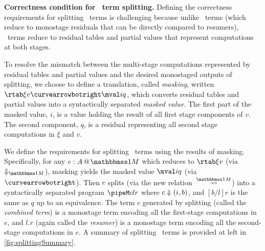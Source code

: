 \begin{abstrsyn}

\textbf{Correctness condition for \bbonem\ term splitting.} Defining
the correctness requirements for splitting \bbonem\ terms is
challenging because unlike \bbtwo\ terms (which reduce to monostage
residuals that can be directly compared to resumers), \bbonem\ terms
reduce to residual tables and partial values that represent
computations at both stages.

To resolve the mismatch between the multi-stage computations
represented by residual tables and partial values and the desired
monostaged outputs of splitting, we choose to define a translation,
called {\em masking}, written $\rtab \xi v \vsplito \mval i q$, which
converts residual tables and partial values into a syntactically
separated {\em masked value}.  The first part of the masked value,
$i$, is a value holding the result of all first stage components of
$v$.  The second component, $q$, is a residual representing all second
stage computations in $\xi$ and $v$.

We define the requirements for splitting \bbonem\ terms using the
results of masking. Specifically, for any $\colmix e A$ which reduces
to $\rtab \xi v$ (via $\redonesym$), masking yields the masked value
$\mval i q$ (via~$\vsplito$).  Then $e$ splits (via the new
relation~$\splitonesym$) into a syntactically separated program
$\pipeM c l r$ where ${c} \Downarrow {(}i,b)$, and $[b/l]r$ is the same as
$q$ up to an equivalence.  The term $c$ generated by splitting (called
the {\em combined term}) is a monostage term encoding all the
first-stage computations in $e$, and $l.r$ (again called the {\em
  resumer}) is a monostage term encoding all the second-stage
computations in $e$.  A summary of splitting \bbonem\ terms is
provided at left in \ref{fig:splittingSummary}.




\end{abstrsyn}
